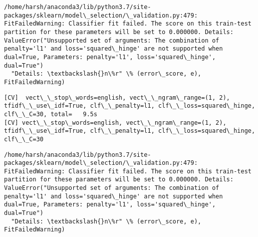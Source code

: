 \documentclass[11pt]{article}
\begin{document}
    \begin{Verbatim}[commandchars=\\\{\}]
/home/harsh/anaconda3/lib/python3.7/site-packages/sklearn/model\_selection/\_validation.py:479: FitFailedWarning: Classifier fit failed. The score on this train-test partition for these parameters will be set to 0.000000. Details: 
ValueError("Unsupported set of arguments: The combination of penalty='l1' and loss='squared\_hinge' are not supported when dual=True, Parameters: penalty='l1', loss='squared\_hinge', dual=True")
  "Details: \textbackslash{}n\%r" \% (error\_score, e), FitFailedWarning)

    \end{Verbatim}

    \begin{Verbatim}[commandchars=\\\{\}]
[CV]  vect\_\_stop\_words=english, vect\_\_ngram\_range=(1, 2), tfidf\_\_use\_idf=True, clf\_\_penalty=l1, clf\_\_loss=squared\_hinge, clf\_\_C=30, total=   9.5s
[CV] vect\_\_stop\_words=english, vect\_\_ngram\_range=(1, 2), tfidf\_\_use\_idf=True, clf\_\_penalty=l1, clf\_\_loss=squared\_hinge, clf\_\_C=30 

    \end{Verbatim}

    \begin{Verbatim}[commandchars=\\\{\}]
/home/harsh/anaconda3/lib/python3.7/site-packages/sklearn/model\_selection/\_validation.py:479: FitFailedWarning: Classifier fit failed. The score on this train-test partition for these parameters will be set to 0.000000. Details: 
ValueError("Unsupported set of arguments: The combination of penalty='l1' and loss='squared\_hinge' are not supported when dual=True, Parameters: penalty='l1', loss='squared\_hinge', dual=True")
  "Details: \textbackslash{}n\%r" \% (error\_score, e), FitFailedWarning)

    \end{Verbatim}
\end{document}
